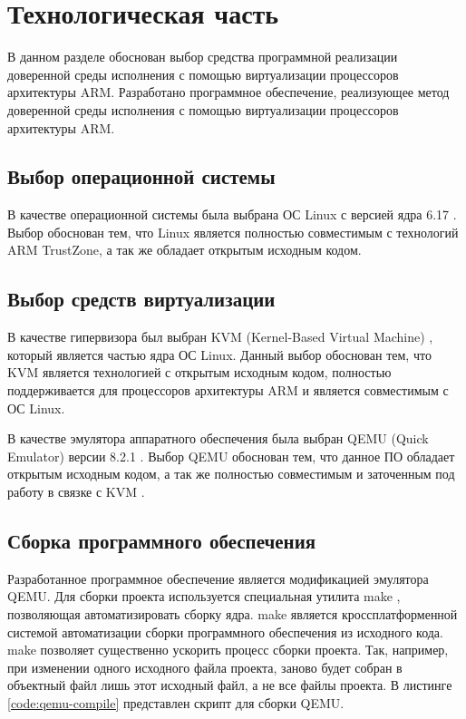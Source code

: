 \section{Технологическая часть}

В данном разделе обоснован выбор средства программной реализации доверенной среды исполнения с помощью виртуализации процессоров архитектуры ARM.
Разработано программное обеспечение, реализующее метод доверенной среды исполнения с помощью виртуализации процессоров архитектуры ARM.

\subsection{Выбор операционной системы}

В качестве операционной системы была выбрана ОС Linux с версией ядра 6.17 \cite{linux}. Выбор обоснован тем, что Linux является полностью совместимым с технологий ARM TrustZone, а так же обладает открытым исходным кодом.

\subsection{Выбор средств виртуализации}

В качестве гипервизора был выбран KVM (Kernel-Based Virtual Machine) \cite{kvm}, который является частью ядра ОС Linux. Данный выбор обоснован тем, что KVM является технологией с открытым исходным кодом, полностью поддерживается для процессоров архитектуры ARM и является совместимым с ОС Linux.

В качестве эмулятора аппаратного обеспечения была выбран QEMU (Quick Emulator) версии 8.2.1 \cite{qemu}. Выбор QEMU обоснован тем, что данное ПО обладает открытым исходным кодом, а так же полностью совместимым и заточенным под работу в связке с KVM \cite{kvm}.

\subsection{Сборка программного обеспечения}

Разработанное программное обеспечение является модификацией эмулятора QEMU. Для сборки проекта используется специальная утилита make \cite{make}, позволяющая автоматизировать сборку ядра. make является кроссплатформенной системой автоматизации сборки программного обеспечения из исходного кода. make позволяет существенно ускорить процесс сборки проекта. Так, например, при изменении одного исходного файла проекта, заново будет собран в объектный файл лишь этот исходный файл, а не все файлы проекта. В листинге \ref{code:qemu-compile} представлен скрипт для сборки QEMU.

